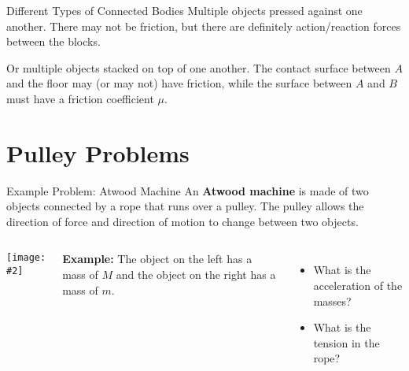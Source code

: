\documentclass[12pt,compress,aspectratio=169]{beamer}
\newcommand{\pic}[2]{\texttt{[image: \#2]}}
\newcommand{\mb}[1]{\ensuremath\mathbf{#1}}
\begin{document}
\begin{frame}{Different Types of Connected Bodies}
  Multiple objects pressed against one another. There may not be friction, but
  there are definitely action/reaction forces between the blocks.
  \begin{center}
  \end{center}
  Or multiple objects stacked on top of one another. The contact surface between
  $A$ and the floor may (or may not) have friction, while the surface between
  $A$ and $B$ must have a friction coefficient $\mu$.
  \begin{center}
  \end{center}
\end{frame}


\section{Pulley Problems}

\begin{frame}{Example Problem: Atwood Machine}
  An \textbf{Atwood machine} is made of two objects connected by a rope that
  runs over a pulley. The pulley allows the direction of force and direction
  of motion to change between two objects.
  \begin{columns}
    \begin{center}
      \pic{1}{graphics/pulley_prob_2.png}
    \end{center}
    \textbf{Example:} The object on the left has a mass of $M$ and the object
    on the right has a mass of $m$.
    \begin{itemize}
    \item What is the acceleration of the masses?
    \item What is the tension in the rope?
    \end{itemize}
  \end{columns}
\end{frame}
\end{document}
